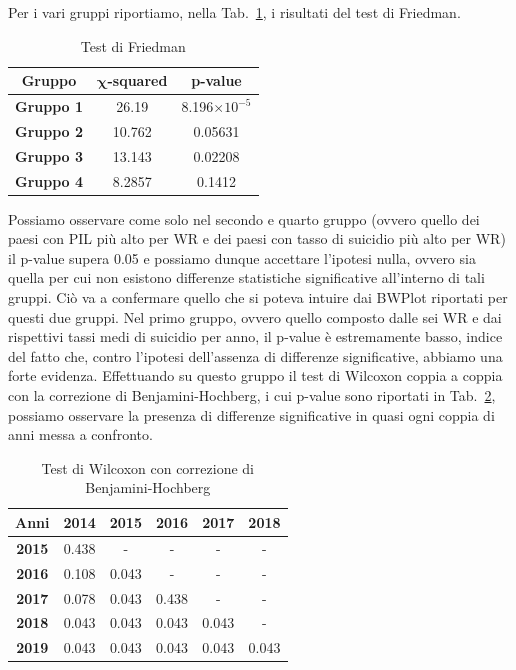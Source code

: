 \documentclass[conference]{IEEEtran}
\begin{document}
Per i vari gruppi riportiamo, nella Tab.~\ref{tab5}, i risultati del test di Friedman.
\begin{table}[htbp]
    \caption{Test di Friedman}
    \begin{center}
    \begin{tabular}{|c|c|c|}
    \hline
    \textbf{Gruppo} & $\boldsymbol{\chi}$\textbf{-squared} & \textbf{p-value} \\
    \hline
    \textbf{Gruppo 1} & 26.19 & 8.196$\times 10^{-5}$ \\\cline{1-3}
    \textbf{Gruppo 2} & 10.762 & 0.05631 \\\cline{1-3}
    \textbf{Gruppo 3} & 13.143 & 0.02208 \\\cline{1-3}
    \textbf{Gruppo 4} & 8.2857 & 0.1412 \\\cline{1-3}
    \hline
    \end{tabular}
    \label{tab5}
    \end{center}
\end{table}
Possiamo osservare come solo nel secondo e quarto gruppo 
(ovvero quello dei paesi con PIL più alto per WR e dei paesi con tasso di
suicidio più alto per WR)
il p-value supera 0.05
e possiamo dunque accettare l'ipotesi nulla, ovvero sia quella per cui non esistono differenze
statistiche significative all'interno di tali gruppi.
Ciò va a confermare quello che si poteva intuire dai BWPlot riportati per questi
due gruppi.
Nel primo gruppo, ovvero quello composto dalle sei WR e dai rispettivi tassi medi di suicidio per
anno, il p-value è estremamente basso, indice del fatto che,
contro l'ipotesi dell'assenza di differenze significative,
abbiamo una forte evidenza.
Effettuando su questo gruppo il
test di Wilcoxon coppia a coppia con la correzione di Benjamini-Hochberg,
i cui p-value sono riportati in Tab.~\ref{tab6}, possiamo osservare la presenza
di differenze significative in quasi ogni coppia di anni
messa a confronto.
\begin{table}[htbp]
    \caption{Test di Wilcoxon con correzione di Benjamini-Hochberg}
    \begin{center}
    \begin{tabular}{|c|c|c|c|c|c|}
    \hline
    \textbf{Anni} & \textbf{2014} & \textbf{2015} & \textbf{2016} & \textbf{2017} & \textbf{2018} \\
    \hline
    \textbf{2015} & 0.438 & - & - & - & - \\ \hline
    \textbf{2016} & 0.108 & 0.043 & - & - & - \\ \hline
    \textbf{2017} & 0.078 & 0.043 & 0.438 & - & - \\ \hline
    \textbf{2018} & 0.043 & 0.043 & 0.043 & 0.043 & - \\ \hline
    \textbf{2019} & 0.043 & 0.043 & 0.043 & 0.043 & 0.043 \\ 
    \hline
    \end{tabular}
    \label{tab6}
    \end{center}
\end{table}
\end{document}
